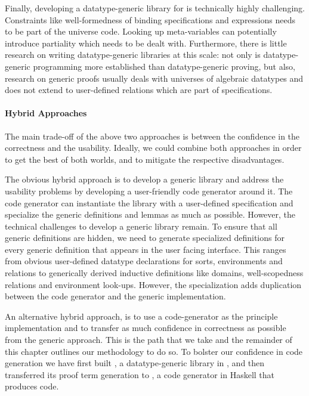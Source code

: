 Finally, developing a datatype-generic library for \Knot is technically highly challenging.
Constraints like well-formedness of binding specifications and expressions needs
to be part of the universe code. Looking up meta-variables can potentially
introduce partiality which needs to be dealt with. Furthermore, there is little
research on writing datatype-generic libraries at this scale: not only is
datatype-generic programming more established than datatype-generic proving, but
also, research on generic proofs usually deals with universes of algebraic
datatypes and does not extend to user-defined relations which are part of \Knot
specifications.

\paragraph{Hybrid Approaches}

The main trade-off of the above two approaches is between the confidence in the
correctness and the usability. Ideally, we could combine both approaches in
order to get the best of both worlds, and to mitigate the respective disadvantages.

The obvious hybrid approach is to develop a generic library and address the
usability problems by developing a user-friendly code generator around it. The
code generator can instantiate the library with a user-defined specification
and specialize the generic definitions and lemmas as much as possible. However,
the technical challenges to develop a generic library remain.
To ensure that all generic definitions are hidden, we need to generate
specialized definitions for every generic definition that appears in the user
facing interface. This ranges from obvious user-defined datatype
declarations for sorts, environments and relations to generically derived
inductive definitions like domains, well-scopedness relations and environment
look-ups. However, the specialization adds duplication between the
code generator and the generic implementation.


An alternative hybrid approach, is to use a code-generator as the principle
implementation and to transfer as much confidence in correctness as possible
from the generic approach. This is the path that we take and the remainder of
this chapter outlines our methodology to do so. To bolster our confidence in
code generation we have first built \Loom, a datatype-generic library in \Coq,
and then transferred its proof term generation to \Needle, a code generator in
Haskell that produces \Coq code.

